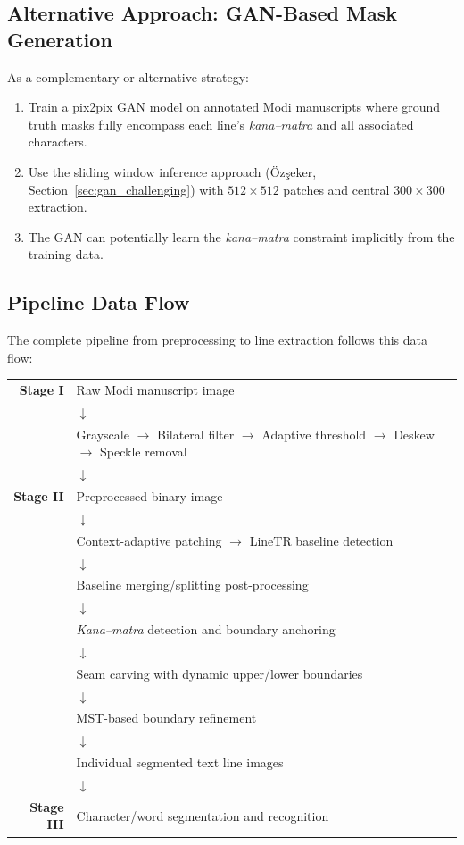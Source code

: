 \documentclass[11pt, a4paper]{article}
\begin{document}
\subsection{Alternative Approach: GAN-Based Mask Generation}

As a complementary or alternative strategy:
\begin{enumerate}[leftmargin=1.5em]
    \item Train a pix2pix GAN model on annotated Modi manuscripts where ground truth masks fully encompass each line's \textit{kana--matra} and all associated characters.
    \item Use the sliding window inference approach (\"Oz\c{s}eker, Section~\ref{sec:gan_challenging}) with $512\times512$ patches and central $300\times300$ extraction.
    \item The GAN can potentially learn the \textit{kana--matra} constraint implicitly from the training data.
\end{enumerate}

\subsection{Pipeline Data Flow}

\noindent
The complete pipeline from preprocessing to line extraction follows this data flow:

\begin{center}
\begin{small}
\begin{tabular}{rl}
\textbf{Stage I} & Raw Modi manuscript image \\
& $\downarrow$ \\
& Grayscale $\rightarrow$ Bilateral filter $\rightarrow$ Adaptive threshold $\rightarrow$ Deskew $\rightarrow$ Speckle removal \\
& $\downarrow$ \\
\textbf{Stage II} & Preprocessed binary image \\
& $\downarrow$ \\
& Context-adaptive patching $\rightarrow$ LineTR baseline detection \\
& $\downarrow$ \\
& Baseline merging/splitting post-processing \\
& $\downarrow$ \\
& \textit{Kana--matra} detection and boundary anchoring \\
& $\downarrow$ \\
& Seam carving with dynamic upper/lower boundaries \\
& $\downarrow$ \\
& MST-based boundary refinement \\
& $\downarrow$ \\
& Individual segmented text line images \\
& $\downarrow$ \\
\textbf{Stage III} & Character/word segmentation and recognition \\
\end{tabular}
\end{small}
\end{center}
\end{document}
